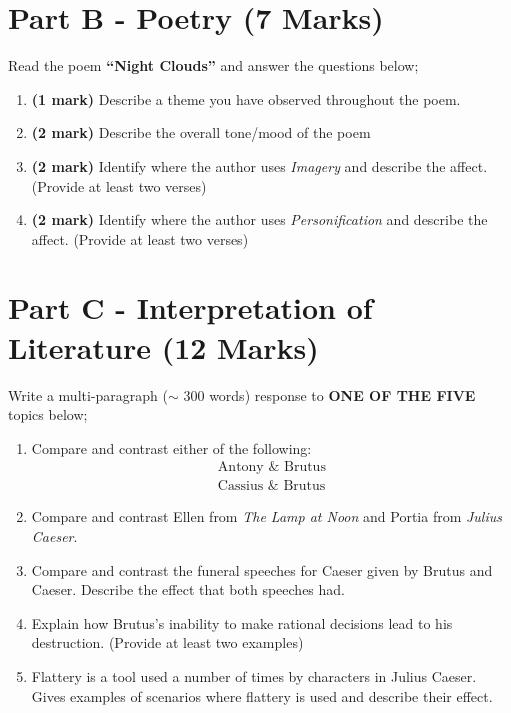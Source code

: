 \documentclass[12pt]{article} %
\begin{document}
\newpage

\section*{Part B - Poetry (7 Marks)}
\begin{qstn}
  Read the poem \textbf{``Night Clouds''} and answer the questions below;
  \begin{enumerate}[label=(\alph*)]
    \item \textbf{(1 mark)} Describe a theme you have observed throughout the poem.
            \vspace*{2cm}
    \item \textbf{(2 mark)} Describe the overall tone/mood of the poem
            \vspace*{2cm}
    \item \textbf{(2 mark)} Identify where the author uses \textit{Imagery} and describe the affect. (Provide at least two verses)
            \vspace*{7cm}
    \item \textbf{(2 mark)} Identify where the author uses \textit{Personification} and describe the affect. (Provide at least two verses)
          \newpage
  \end{enumerate}


\section*{Part C - Interpretation of Literature (12 Marks)}
Write a multi-paragraph ($\sim$ 300 words) response to \textbf{ONE OF THE FIVE} topics below;
  \begin{enumerate}
    \item Compare and contrast either of the following:
          \begin{align*}
            \text{Antony } \& \text{ Brutus}\\
            \text{Cassius } \& \text{ Brutus}
          \end{align*}
    \item Compare and contrast Ellen from \textit{The Lamp at Noon} and Portia from \textit{Julius Caeser}.
    \item Compare and contrast the funeral speeches for Caeser given by Brutus and Caeser. Describe the effect that both speeches had.
    \item Explain how Brutus's inability to make rational decisions lead to his destruction. (Provide at least two examples)
    \item Flattery is a tool used a number of times by characters in Julius Caeser. Gives examples of scenarios where flattery is used and
          describe their effect.
  \end{enumerate}


\end{qstn}
\end{document}
